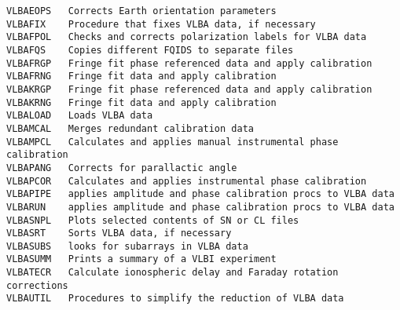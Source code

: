 \begin{verbatim}
VLBAEOPS   Corrects Earth orientation parameters
VLBAFIX    Procedure that fixes VLBA data, if necessary
VLBAFPOL   Checks and corrects polarization labels for VLBA data
VLBAFQS    Copies different FQIDS to separate files
VLBAFRGP   Fringe fit phase referenced data and apply calibration
VLBAFRNG   Fringe fit data and apply calibration
VLBAKRGP   Fringe fit phase referenced data and apply calibration
VLBAKRNG   Fringe fit data and apply calibration
VLBALOAD   Loads VLBA data
VLBAMCAL   Merges redundant calibration data
VLBAMPCL   Calculates and applies manual instrumental phase calibration
VLBAPANG   Corrects for parallactic angle
VLBAPCOR   Calculates and applies instrumental phase calibration
VLBAPIPE   applies amplitude and phase calibration procs to VLBA data
VLBARUN    applies amplitude and phase calibration procs to VLBA data
VLBASNPL   Plots selected contents of SN or CL files
VLBASRT    Sorts VLBA data, if necessary
VLBASUBS   looks for subarrays in VLBA data
VLBASUMM   Prints a summary of a VLBI experiment
VLBATECR   Calculate ionospheric delay and Faraday rotation corrections
VLBAUTIL   Procedures to simplify the reduction of VLBA data
\end{verbatim}\eve


